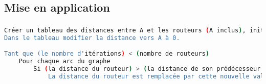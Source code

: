 \documentclass[svgnames,11pt]{beamer}
\begin{document}
\subsection{Mise en application}
\begin{frame}[fragile]
    \frametitle{}

    \begin{center}
        \begin{lstlisting}[language=Bash, basicstyle=\small, xrightmargin=0.5em, xleftmargin=0.5em]
Créer un tableau des distances entre A et les routeurs (A inclus), initialisées à l'infini.
Dans le tableau modifier la distance vers A à 0.

Tant que (le nombre d'itérations) < (nombre de routeurs)
    Pour chaque arc du graphe
        Si (la distance du routeur) > (la distance de son prédécesseur + poids de l'arc entre les deux routeurs)
            La distance du routeur est remplacée par cette nouvelle valeur
    \end{lstlisting}
        \label{bf}
    \end{center}
\end{frame}
\end{document}
